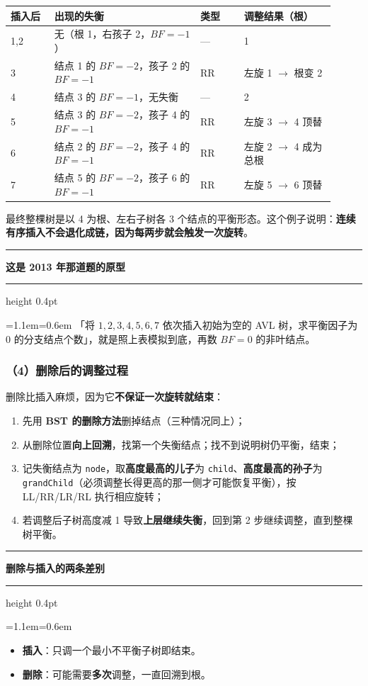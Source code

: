 \documentclass[11pt,openany,UTF8]{ctexbook}
\newcommand{\callouthead}[2]{%
  \par\addvspace{7pt}\noindent
  {\color{#1}\rule[-0.15em]{3pt}{1.05em}}\hspace{0.5em}%
  {\bfseries\color{#1}#2}\par\nobreak\vspace{-0.35em}%
  {\color{rulesep}\hrule height 0.4pt}\nobreak\vspace{0.45em}%
  \begingroup\small\setlength{\parindent}{0pt}%
  \leftskip=1.1em\rightskip=0.6em\noindent\ignorespaces}
\newcommand{\calloutend}{\par\endgroup\addvspace{7pt}}
\newenvironment{callwarn}[1]{\callouthead{warnbar}{#1}}{\calloutend}
\newenvironment{callexam}[1]{\callouthead{exambar}{#1}}{\calloutend}
\begin{document}
\begingroup\small\setlength{\tabcolsep}{4.0pt}
\begin{longtable}{@{}L{0.1276\linewidth}L{0.4055\linewidth}L{0.1276\linewidth}L{0.2506\linewidth}@{}}
\toprule
\textbf{插入后} & \textbf{出现的失衡} & \textbf{类型} & \textbf{调整结果（根）} \\
\midrule
{},2 & 无（根 1，右孩子 2，$BF=-1$） & — & 1 \\
3 & 结点 1 的 $BF=-2$，孩子 2 的 $BF=-1$ & RR & 左旋 1 $\to$ 根变 2 \\
4 & 结点 3 的 $BF=-1$，无失衡 & — & 2 \\
5 & 结点 3 的 $BF=-2$，孩子 4 的 $BF=-1$ & RR & 左旋 3 $\to$ 4 顶替 \\
6 & 结点 2 的 $BF=-2$，孩子 4 的 $BF=-1$ & RR & 左旋 2 $\to$ 4 成为总根 \\
7 & 结点 5 的 $BF=-2$，孩子 6 的 $BF=-1$ & RR & 左旋 5 $\to$ 6 顶替 \\
\bottomrule
\end{longtable}
\endgroup

最终整棵树是以 4 为根、左右子树各 3 个结点的平衡形态。这个例子说明：\textbf{连续有序插入不会退化成链，因为每两步就会触发一次旋转}。

\begin{callexam}{这是 2013 年那道题的原型}
「将 $1,2,3,4,5,6,7$ 依次插入初始为空的 AVL 树，求平衡因子为 0 的分支结点个数」，就是照上表模拟到底，再数 $BF=0$ 的非叶结点。

\end{callexam}

\subsubsection{（4）删除后的调整过程}

删除比插入麻烦，因为它\textbf{不保证一次旋转就结束}：

\begin{enumerate}
\item 先用 \textbf{BST 的删除方法}删掉结点（三种情况同上）；
\item 从删除位置\textbf{向上回溯}，找第一个失衡结点；找不到说明树仍平衡，结束；
\item 记失衡结点为 \texttt{node}，取\textbf{高度最高的儿子}为 \texttt{child}、\textbf{高度最高的孙子}为 \texttt{grandChild}（必须调整长得更高的那一侧才可能恢复平衡），按 LL/RR/LR/RL 执行相应旋转；
\item 若调整后子树高度减 1 导致\textbf{上层继续失衡}，回到第 2 步继续调整，直到整棵树平衡。
\end{enumerate}
\begin{callwarn}{删除与插入的两条差别}
\begin{itemize}
\item \textbf{插入}：只调一个最小不平衡子树即结束。
\item \textbf{删除}：可能需要\textbf{多次}调整，一直回溯到根。
\end{itemize}
\end{callwarn}
\end{document}

